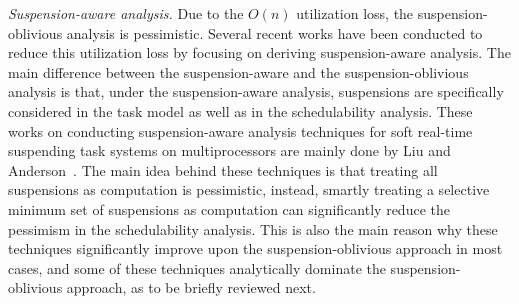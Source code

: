 \textit{Suspension-aware analysis.} Due to the $O(n)$ utilization loss, the suspension-oblivious analysis is pessimistic. Several recent works have been conducted to reduce this utilization loss by focusing on deriving suspension-aware analysis. The main difference between the suspension-aware and the suspension-oblivious analysis is that, under the suspension-aware analysis, suspensions are specifically considered in the task model as well as in the schedulability analysis. These works on conducting suspension-aware analysis techniques for soft real-time suspending task systems on multiprocessors are mainly done by Liu and Anderson~\cite{Liu3,Liu4,Liu5,Liu9,Liu11}. The main idea behind these techniques is that treating all suspensions as computation is pessimistic, instead, smartly treating a selective minimum set of suspensions as computation can significantly reduce the pessimism in the schedulability analysis. This is also the main reason why these techniques significantly improve upon the suspension-oblivious approach in most cases, and some of these techniques analytically dominate the suspension-oblivious approach, as to be briefly reviewed next.

